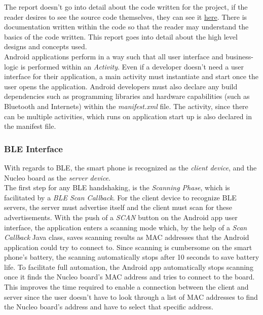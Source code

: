 The report doesn't go into detail about the code written for the project, if the reader desires to see the source code themselves, they can see it \href{https://github.com/lebrice/MicroP/tree/master/project}{here}. There is documentation written within the code so that the reader may understand the basics of the code written. This report goes into detail about the high level designs and concepts used.\\

Android applications perform in a way such that all user interface and business-logic is performed within an \textit{Activity}. Even if a developer doesn't need a user interface for their application, a main activity must instantiate and start once the user opens the application. Android developers must also declare any build dependencies such as programming libraries and hardware capabilities (such as Bluetooth and Internets) within the \textit{manifest.xml} file. The activity, since there can be multiple activities, which runs on application start up is also declared in the manifest file.\\

\subsubsection{BLE Interface}

With regards to BLE, the smart phone is recognized as the \textit{client device}, and the Nucleo board as the \textit{server device}.\\ 

The first step for any BLE handshaking, is the \textit{Scanning Phase}, which is facilitated by a \textit{BLE Scan Callback}. For the client device to recognize BLE servers, the server must advertise itself and the client must scan for these advertisements. With the push of a \textit{SCAN} button on the Android app user interface, the application enters a scanning mode which, by the help of a \textit{Scan Callback} Java class, saves scanning results as MAC addresses that the Android application could try to connect to. Since scanning is cumbersome on the smart phone's battery, the scanning automatically stops after 10 seconds to save battery life. To facilitate full automation, the Android app automatically stops scanning once it finds the Nucleo board's MAC address and tries to connect to the board. This improves the time required to enable a connection between the client and server since the user doesn't have to look through a list of MAC addresses to find the Nucleo board's address and have to select that specific address.\\

